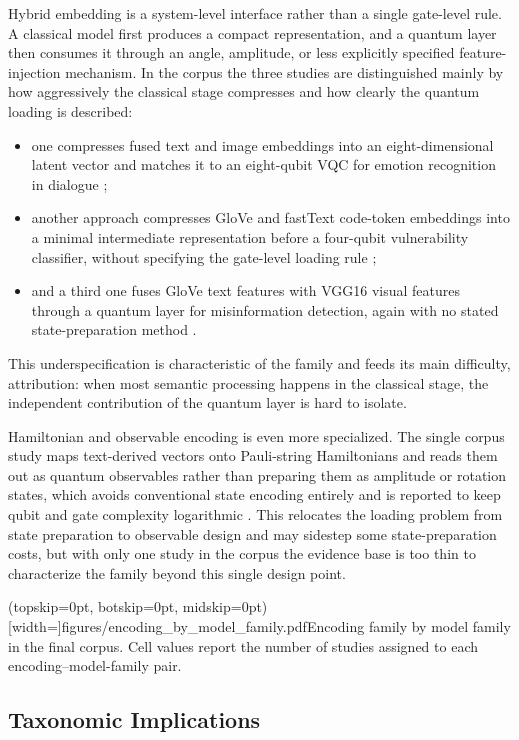 \documentclass{ieeeaccess}
\begin{document}
Hybrid embedding is a system-level interface rather than a single gate-level rule. A classical model first produces a compact representation, and a quantum layer then consumes it through an angle, amplitude, or less explicitly specified feature-injection mechanism. In the corpus the three studies are distinguished mainly by how aggressively the classical stage compresses and how clearly the quantum loading is described:  
\begin{itemize}
    \item one compresses fused text and image embeddings into an eight-dimensional latent vector and matches it to an eight-qubit VQC for emotion recognition in dialogue \cite{castrignano_toward_2025};
    \item another approach compresses GloVe and fastText code-token embeddings into a minimal intermediate representation before a four-qubit vulnerability classifier, without specifying the gate-level loading rule \cite{akter_automated_2023};
    \item and a third one fuses GloVe text features with VGG16 visual features through a quantum layer for misinformation detection, again with no stated state-preparation method \cite{bikku_quantum-enhanced_2025}.
\end{itemize}
   This underspecification is characteristic of the family and feeds its main difficulty, attribution: when most semantic processing happens in the classical stage, the independent contribution of the quantum layer is hard to isolate.

Hamiltonian and observable encoding is even more specialized. The single corpus study maps text-derived vectors onto Pauli-string Hamiltonians and reads them out as quantum observables rather than preparing them as amplitude or rotation states, which avoids conventional state encoding entirely and is reported to keep qubit and gate complexity logarithmic \cite{tiblias_efficient_2026}. This relocates the loading problem from state preparation to observable design and may sidestep some state-preparation costs, but with only one study in the corpus the evidence base is too thin to characterize the family beyond this single design point.

\Figure[t!](topskip=0pt, botskip=0pt, midskip=0pt)[width=\textwidth]{figures/encoding_by_model_family.pdf}{Encoding family by model family in the final corpus. Cell values report the number of studies assigned to each encoding--model-family pair.\label{fig:encoding_model_family}}

\subsection{Taxonomic Implications}
\end{document}
